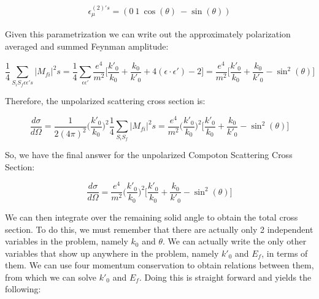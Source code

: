 \documentclass[a4]{article}
\begin{document}
    \begin{equation}
        \begin{aligned}
            \epsilon_{\mu}^{(2)'s}  = (0 \: 1 \: \cos (\theta) \: - \sin (\theta))
        \end{aligned}
    \end{equation}

    Given this parametrization we can write out the approximately polarization averaged and summed Feynman amplitude:

    \begin{equation}
        \frac{1}{4} \sum_{S_i S_f \epsilon \epsilon's} |M_{fi}|^2s = \frac{1}{4} \sum_{\epsilon \epsilon'} \frac{e^4}{m^2} \Big[ \frac{k'_0}{k_0} + \frac{k_0}{k'_0} + 4 (\epsilon \cdot \epsilon') - 2 \Big] = \frac{e^4}{m^2} \Big[ \frac{k'_0}{k_0} + \frac{k_0}{k'_0} - \sin^2 (\theta) \Big]
    \end{equation}

    Therefore, the unpolarized scattering cross section is:

    \begin{equation}
        \frac{d \sigma}{d \Omega} = \frac{1}{2 (4 \pi)^2} \bigg( \frac{k'_0}{k_0} \bigg)^2 \frac{1}{4} \sum_{S_i S_f} |M_{fi}|^2s = \frac{e^4}{m^2} \bigg( \frac{k'_0}{k_0} \bigg)^2 \Big[ \frac{k'_0}{k_0} + \frac{k_0}{k'_0} - \sin^2 (\theta) \Big]
    \end{equation}

    So, we have the final answer for the unpolarized Compoton Scattering Cross Section:

    \begin{framed}
        \begin{equation}
            \frac{d \sigma}{d \Omega} = \frac{e^4}{m^2} \bigg( \frac{k'_0}{k_0} \bigg)^2 \Big[ \frac{k'_0}{k_0} + \frac{k_0}{k'_0} - \sin^2 (\theta) \Big]
        \end{equation}
    \end{framed}

    We can then integrate over the remaining solid angle to obtain the total cross section. To do this, we must remember that there are actually only 2 independent variables in the problem,
    namely $k_0$ and $\theta$. We can actually write the only other variables that show up anywhere in the problem, namely $k'_0$ and $E_f$, in terms of them. We can use four momentum
    conservation to obtain relations between them, from which we can solve $k'_0$ and $E_f$. Doing this is straight forward and yields the following:
\end{document}
